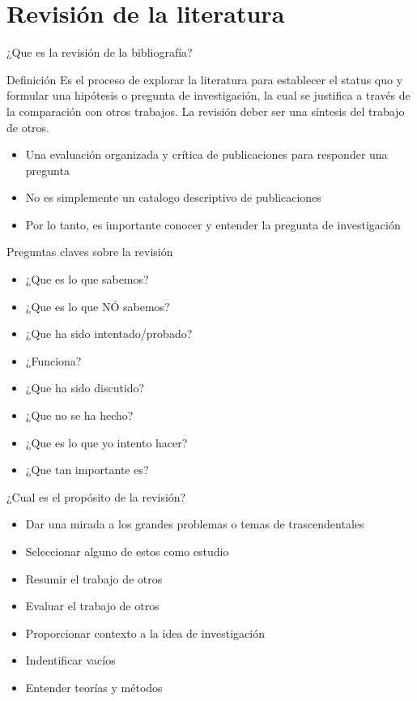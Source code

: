 \documentclass[
10pt,
aspectratio=169,
]{beamer}
\begin{document}
\section{Revisi\'on de la literatura}
\begin{frame}[c]{¿Que es la revisi\'on de la bibliograf\'ia?}
\begin{block}{Definici\'on}
Es el proceso de explorar la literatura para establecer el \alert{status quo} y formular una hip\'otesis o pregunta de investigaci\'on, la cual se justifica a trav\'es de la comparaci\'on con otros trabajos. La revisi\'on deber ser una s\'intesis del trabajo de otros.
\end{block}
\begin{itemize}
\item Una evaluación organizada y crítica de publicaciones para responder una pregunta
\item No es simplemente un catalogo descriptivo de publicaciones
\item Por lo tanto, es importante conocer y entender la pregunta de investigaci\'on
\end{itemize}
\end{frame}

\begin{frame}[c]{Preguntas claves sobre la revisi\'on}
\begin{itemize}
\item ¿Que es lo que sabemos?
\item ¿Que es lo que N\'O sabemos?
\item ¿Que ha sido intentado/probado?
\item ¿Funciona?
\item ¿Que ha sido discutido?
\item ¿Que no se ha hecho?
\item ¿Que es lo que yo intento hacer?
\item ¿Que tan importante es?
\end{itemize}
\end{frame}


\begin{frame}[c]{¿Cual es el prop\'osito de la revisi\'on?}
\begin{itemize}
\item Dar una mirada a los grandes problemas o temas de trascendentales
\item Seleccionar alguno de estos como estudio
\item Resumir el trabajo de otros
\item Evaluar el trabajo de otros
\item Proporcionar contexto a la idea de investigaci\'on
\item Indentificar vac\'ios
\item Entender teor\'ias y m\'etodos
\end{itemize}
\end{frame}
\end{document}
